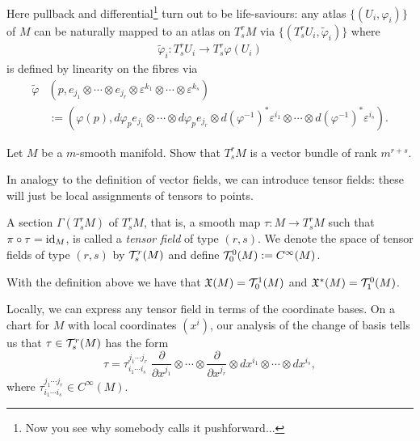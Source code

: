 Here pullback and differential\footnote{Now you see why somebody calls it pushforward...} turn out to be life-saviours:
any atlas $\{(U_i, \varphi_i)\}$ of $M$ can be naturally mapped to an atlas  on $T_s^r M$ via $\{(T_s^r U_i, \widetilde\varphi_i)\}$ where
\begin{align}
  \widetilde\varphi_i : T_s^r U_i \to T_s^r\varphi(U_i)
\end{align}
is defined by linearity on the fibres via
\begin{align}
  \widetilde\varphi & (p, e_{j_1}\otimes\cdots\otimes e_{j_r}\otimes \varepsilon^{k_1}\otimes \cdots\otimes \varepsilon^{k_s})                                                                     \\
                    & :=(\varphi(p), d\varphi_p e_{j_1}\otimes\cdots\otimes d\varphi_p e_{j_r}\otimes d(\varphi^{-1})^*\varepsilon^{i_1}\otimes \cdots\otimes d(\varphi^{-1})^*\varepsilon^{i_s}).
\end{align}

\begin{exercise}
  Let $M$ be a $m$-smooth manifold.
  Show that $T^r_sM$ is a vector bundle of rank $m^{r+s}$.
\end{exercise}

In analogy to the definition of vector fields, we can introduce tensor fields: these will just be local assignments of tensors to points.

\begin{definition}
  A section $\Gamma(T_s^r M)$ of $T_s^r M$, that is, a smooth map $\tau : M \to T_s^r M$ such that $\pi\circ \tau = \operatorname{id}_M$, is called a \emph{tensor field} of type $(r,s)$.
  We denote the space of tensor fields of type $(r,s)$ by $\mathcal{T}_s^r(M)$ and define $\mathcal{T}_0^0(M) := C^\infty(M)$.
\end{definition}

\begin{example}
  With the definition above we have that $\mathfrak{X}(M) = \mathcal{T}_0^1(M)$ and $\mathfrak{X}^*(M) = \mathcal{T}_1^0(M)$.
\end{example}

Locally, we can express any tensor field in terms of the coordinate bases.
On a chart for $M$ with local coordinates $(x^i)$, our analysis of the change of basis tells us that $\tau\in\mathcal{T}_s^r(M)$ has the form
\begin{equation}
  \tau = \tau^{j_1\cdots j_r}_{i_1\cdots i_s}\; \frac{\partial}{\partial x^{j_1}}\otimes\cdots\otimes\frac{\partial}{\partial x^{j_r}}\otimes dx^{i_1}\otimes\cdots\otimes dx^{i_s},
\end{equation}
where $\tau^{j_1\cdots j_r}_{i_1\cdots i_s}\in C^\infty(M)$.

